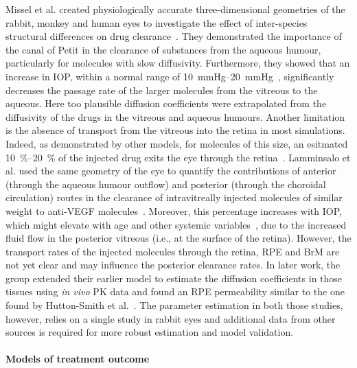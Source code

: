 \documentclass{article}
\begin{document}
Missel et al. created physiologically accurate three-dimensional geometries of the rabbit, monkey and human eyes to investigate the effect of inter-species structural differences on drug clearance~\cite{Missel_2012}.  
They demonstrated the importance of the canal of Petit in the clearance of substances from the aqueous humour, particularly for molecules with slow diffusivity. 
Furthermore, they showed that an increase in IOP, within a normal range of \SIrange[range-units = single, range-phrase={ {to} }]{10}{20}{\mmHg}~\cite{Baek_2015}, significantly decreases the passage rate of the larger molecules from the vitreous to the aqueous.
Here too plausible diffusion coefficients were extrapolated from the diffusivity of the drugs in the vitreous and aqueous humours.
Another limitation is the absence of transport from the vitreous into the retina in most simulations.
Indeed, as demonstrated by other models, for molecules of this size, an esitmated \SIrange{10}{20}{\percent} of the injected drug exits the eye through the retina~\cite{HuttonSmith_2018,Lamminsalo_2018}.
Lamminsalo et al. used the same geometry of the eye to quantify the contributions of anterior (through the aqueous humour outflow) and posterior (through the choroidal circulation) routes in the clearance of intravitreally injected molecules of similar weight to anti-VEGF molecules~\cite{Lamminsalo_2018}.
Moreover, this percentage increases with IOP, which might elevate with age and other systemic variables~\cite{Armaly_1967,Baek_2015,Hashemi_2005}, due to the increased fluid flow in the posterior vitreous (i.e., at the surface of the retina).
However, the transport rates of the injected molecules through the retina, RPE and BrM are not yet clear and may influence the posterior clearance rates.
In later work, the group extended their earlier model to estimate the diffusion coefficients in those tissues using \textit{in vivo} PK data and found an RPE permeability similar to the one found by Hutton-Smith et al.~\cite{HuttonSmith_2017, Lamminsalo_2020}.
The parameter estimation in both those studies, however, relies on a single study in rabbit eyes and additional data from other sources is required for more robust estimation and model validation.

\paragraph*{Models of treatment outcome}
\end{document}
